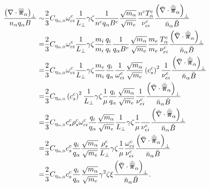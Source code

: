 \begin{align*}
    \frac{\left(\nabla\cdot\boldsymbol{\overline{\overline{\pi}}}_\alpha\right)_\perp}{n_\alpha q_\alpha B}
    \sim&
    \frac{2}{3}
    C_{\eta_{\alpha,0}}
     \omega^c_{ci}
     \frac{1}{L_\perp}
     \gamma
     \zeta
     \frac{1}{n^c q_\alpha B^c}
     \frac{\sqrt{m_\alpha}}{\sqrt{m_e}}
     \frac{n^c T^c_\alpha}{\nu^c_{ei}}
     \frac{ \left(\breve{\nabla}\cdot\breve{\boldsymbol{\overline{\overline{\pi}}}}_\alpha\right)_\perp }{\breve{n}_\alpha \breve{B}}
     \\
     =&
    \frac{2}{3}
    C_{\eta_{\alpha,0}}
     \omega^c_{ci}
     \frac{1}{L_\perp}
     \gamma
     \zeta
     \frac{m_i}{m_i}
     \frac{q_i}{q_i}
     \frac{1}{q_\alpha B^c}
     \frac{\sqrt{m_\alpha}}{\sqrt{m_e}}
     \frac{m_e}{m_e}
     \frac{T^c_\alpha}{\nu^c_{ei}}
     \frac{ \left(\breve{\nabla}\cdot\breve{\boldsymbol{\overline{\overline{\pi}}}}_\alpha\right)_\perp }{\breve{n}_\alpha \breve{B}}
     \\
     =&
    \frac{2}{3}
    C_{\eta_{\alpha,0}}
     \omega^c_{ci}
     \frac{1}{L_\perp}
     \gamma
     \zeta
     \frac{m_e}{m_i}
     \frac{q_i}{q_\alpha}
     \frac{1}{\omega^c_{ci}}
     \frac{\sqrt{m_\alpha}}{\sqrt{m_e}}
     \left(c^c_s\right)^2
     \frac{1}{\nu^c_{ei}}
     \frac{ \left(\breve{\nabla}\cdot\breve{\boldsymbol{\overline{\overline{\pi}}}}_\alpha\right)_\perp }{\breve{n}_\alpha \breve{B}}
     \\
     =&
    \frac{2}{3}
    C_{\eta_{\alpha,0}}
    \left(c^c_s\right)^2
     \frac{1}{L_\perp}
     \gamma
     \zeta
     \frac{1}{\mu}
     \frac{q_i}{q_\alpha}
     \frac{\sqrt{m_\alpha}}{\sqrt{m_e}}
     \frac{1}{\nu^c_{ei}}
     \frac{ \left(\breve{\nabla}\cdot\breve{\boldsymbol{\overline{\overline{\pi}}}}_\alpha\right)_\perp }{\breve{n}_\alpha \breve{B}}
     \\
     =&
    \frac{2}{3}
    C_{\eta_{\alpha,0}}
     c^c_s
     \rho^c_s
     \omega^c_{ci}
     \frac{q_i}{q_\alpha}
     \frac{\sqrt{m_\alpha}}{\sqrt{m_e}}
     \frac{1}{L_\perp}
     \gamma
     \zeta
     \frac{1}{\mu}
     \frac{}{\nu^c_{ei}}
     \frac{ \left(\breve{\nabla}\cdot\breve{\boldsymbol{\overline{\overline{\pi}}}}_\alpha\right)_\perp }{\breve{n}_\alpha \breve{B}}
     \\
     =&
    \frac{2}{3}
    C_{\eta_{\alpha,0}}
     c^c_s
     \frac{q_i}{q_\alpha}
     \frac{\sqrt{m_\alpha}}{\sqrt{m_e}}
     \frac{\rho^c_s}{L_\perp}
     \gamma
     \zeta
     \frac{1}{\mu}
     \frac{\omega^c_{ci}}{\nu^c_{ei}}
     \frac{ \left(\breve{\nabla}\cdot\breve{\boldsymbol{\overline{\overline{\pi}}}}_\alpha\right)_\perp }{\breve{n}_\alpha \breve{B}}
     \\
     =&
    \frac{2}{3}
    C_{\eta_{\alpha,0}}
     c^c_s
     \frac{q_i}{q_\alpha}
     \frac{\sqrt{m_\alpha}}{\sqrt{m_e}}
     \gamma^2
     \zeta
     \xi
     \frac{ \left(\breve{\nabla}\cdot\breve{\boldsymbol{\overline{\overline{\pi}}}}_\alpha\right)_\perp }{\breve{n}_\alpha \breve{B}}.
\end{align*}
%


